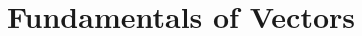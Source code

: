 \documentclass[a5paper,10pt]{book}
\begin{document}
\begin{multicols*}{2}


\end{multicols*}




\newpage
\thispagestyle{empty}
\mbox{}
\newpage

\chapter{Fundamentals of Vectors}
\end{document}
